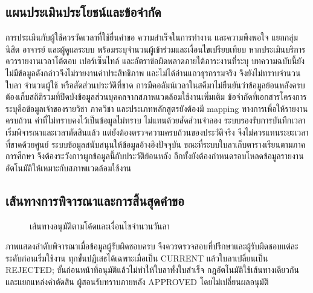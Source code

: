 \subsection{แผนประเมินประโยชน์และข้อจำกัด}
การประเมินกับผู้ใช้ควรวัดเวลาที่ใช้ยื่นคำขอ ความสำเร็จในการทำงาน และความพึงพอใจ แยกกลุ่มนิสิต อาจารย์ และผู้ดูแลระบบ พร้อมระบุจำนวนผู้เข้าร่วมและเงื่อนไขเปรียบเทียบ หากประเมินบริการควรรายงานเวลาโต้ตอบ เปอร์เซ็นไทล์ และอัตราข้อผิดพลาดภายใต้ภาระงานที่ระบุ บทความฉบับนี้ยังไม่มีข้อมูลดังกล่าวจึงไม่รายงานค่าประสิทธิภาพ และไม่ได้อ่านแถวธุรกรรมจริง จึงยังไม่ทราบจำนวนใบลา จำนวนผู้ใช้ หรือสัดส่วนประวัติที่ขาด การมีคอลัมน์เวลาในสคีมาไม่ยืนยันว่าข้อมูลย้อนหลังครบ ต้องเก็บสถิติรวมที่ปิดบังข้อมูลส่วนบุคคลจากสภาพแวดล้อมใช้งานเพิ่มเติม
ข้อจำกัดที่เอกสารโครงการระบุคือข้อมูลเจ้าของรายวิชา ภาควิชา และประเภทหลักสูตรยังต้องมี mapping ทางการเพื่อให้รายงานครบถ้วน ค่าที่ไม่ทราบคงไว้เป็นข้อมูลไม่ทราบ ไม่แทนด้วยสัดส่วนจำลอง ระบบรองรับการบันทึกเวลาเริ่มพิจารณาและเวลาตัดสินแล้ว แต่ยังต้องตรวจความครบถ้วนของประวัติจริง จึงไม่ควรแทนระยะเวลาที่ขาดด้วยศูนย์ ระบบข้อมูลสนับสนุนให้ข้อมูลอ้างอิงปัจจุบัน ขณะที่ระบบใบลาเก็บตารางเรียนตามภาคการศึกษา จึงต้องระวังการผูกข้อมูลนี้กับประวัติย้อนหลัง อีกทั้งยังต้องกำหนดรอบโหลดข้อมูลรายงานอัตโนมัติให้เหมาะกับสภาพแวดล้อมใช้งาน



\subsection{เส้นทางการพิจารณาและการสิ้นสุดคำขอ}
\begin{figure}[H]\centering
{}
\caption{เส้นทางอนุมัติตามโค้ดและเงื่อนไขจำนวนวันลา}\label{fig:approval-route}
\end{figure}
ภาพแสดงลำดับพิจารณาเมื่อข้อมูลผู้รับผิดชอบครบ จึงควรตรวจสอบที่ปรึกษาและผู้รับผิดชอบแต่ละระดับก่อนเริ่มใช้งาน ทุกขั้นปฏิเสธได้เฉพาะเมื่อเป็น CURRENT แล้วใบลาเปลี่ยนเป็น REJECTED; ขั้นก่อนหน้าที่อนุมัติแล้วไม่ทำให้ใบลาทั้งใบสำเร็จ กฎอัตโนมัติใช้เส้นทางเดียวกันและแยกแหล่งคำตัดสิน ผู้สอนรับทราบภายหลัง APPROVED โดยไม่เปลี่ยนผลอนุมัติ


